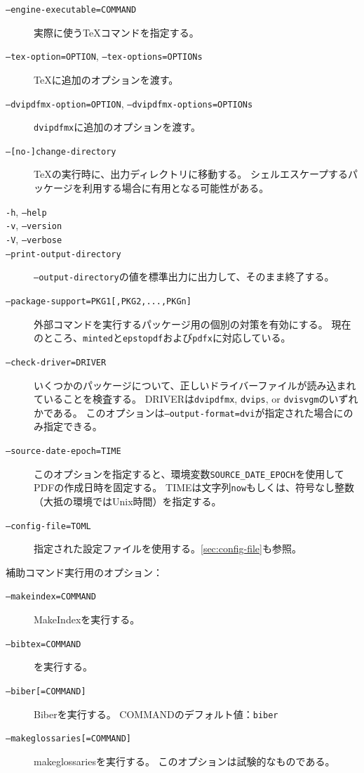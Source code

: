 \documentclass[a4paper]{ltjsreport}
\newcommand\metavar[1]{\textsf{#1}}
\begin{document}
\begin{description}
\item[\texttt{--engine-executable=\metavar{COMMAND}}]
  実際に使う\TeX{}コマンドを指定する。
\item[\texttt{--tex-option=\metavar{OPTION}}, \texttt{--tex-options=\metavar{OPTIONs}}]
  \TeX{}に追加のオプションを渡す。
\item[\texttt{--dvipdfmx-option=\metavar{OPTION}}, \texttt{--dvipdfmx-options=\metavar{OPTIONs}}]
  \texttt{dvipdfmx}に追加のオプションを渡す。
\item[\texttt{--[no-]change-directory}]
  \TeX{}の実行時に、出力ディレクトリに移動する。
  シェルエスケープするパッケージを利用する場合に有用となる可能性がある。
\item[\texttt{-h}, \texttt{--help}]
\item[\texttt{-v}, \texttt{--version}]
\item[\texttt{-V}, \texttt{--verbose}]
\item[\texttt{--print-output-directory}]
  \texttt{--output-directory}の値を標準出力に出力して、そのまま終了する。
\item[\texttt{--package-support=PKG1[,PKG2,...,PKGn]}]
  外部コマンドを実行するパッケージ用の個別の対策を有効にする。
  現在のところ、\texttt{minted}と\texttt{epstopdf}および\texttt{pdfx}に対応している。
\item[\texttt{--check-driver=DRIVER}]
  いくつかのパッケージについて、正しいドライバーファイルが読み込まれていることを検査する。
  \metavar{DRIVER}は\texttt{dvipdfmx}, \texttt{dvips}, or \texttt{dvisvgm}のいずれかである。
  このオプションは\texttt{--output-format=dvi}が指定された場合にのみ指定できる。
\item[\texttt{--source-date-epoch=TIME}]
  このオプションを指定すると、環境変数\texttt{SOURCE\_DATE\_EPOCH}を使用してPDFの作成日時を固定する。
  \metavar{TIME}は文字列\texttt{now}もしくは、符号なし整数（大抵の環境ではUnix時間）を指定する。
\item[\texttt{--config-file=TOML}]
  指定された設定ファイルを使用する。\cref{sec:config-file}も参照。
\end{description}

補助コマンド実行用のオプション：
\begin{description}
\item[\texttt{--makeindex=\metavar{COMMAND}}]
  MakeIndexを実行する。
\item[\texttt{--bibtex=\metavar{COMMAND}}]
  \BibTeX{}を実行する。
\item[\texttt{--biber[=\metavar{COMMAND}]}]
  Biberを実行する。
  \metavar{COMMAND}のデフォルト値：\texttt{biber}
\item[\texttt{--makeglossaries[=\metavar{COMMAND}]}]
  makeglossariesを実行する。
  このオプションは試験的なものである。
\end{description}
\end{document}
